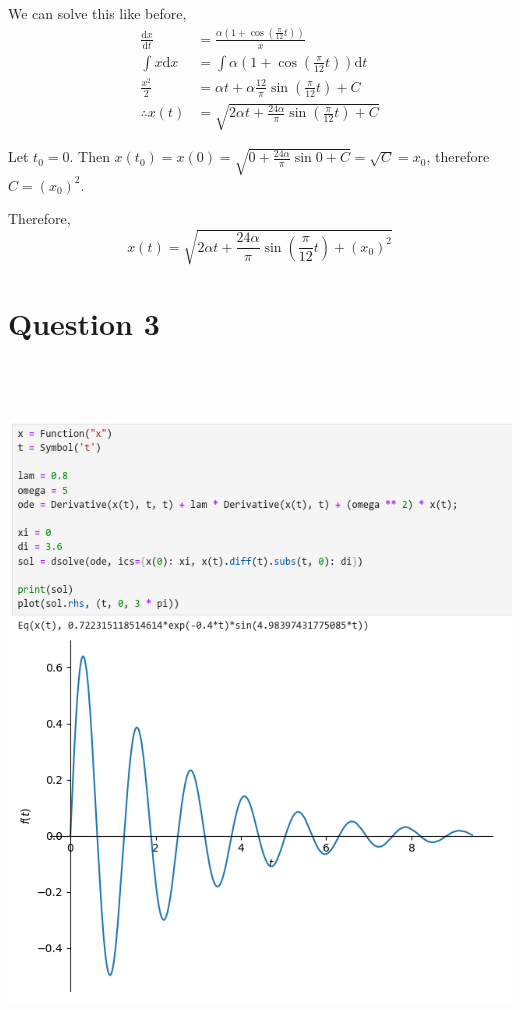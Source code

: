 \documentclass[a4paper]{article}
\begin{document}
We can solve this like before, \begin{align*}
	\frac{\mathrm d x}{\mathrm d t} &= \frac{\alpha \left(1 + \cos\left( \frac{\pi}{12} t \right)\right)}{x}\\[1ex]
	\int x \mathrm d x &= \int \alpha \left( 1 + \cos\left(\frac{\pi}{12} t\right) \right) \mathrm d t\\[1ex]
	\frac{x^2}{2} &= \alpha t + \alpha \frac{12}{\pi} \sin \left(\frac{\pi}{12} t\right) + C\\[1ex]
	\therefore x(t) &= \sqrt{2\alpha t + \frac{24\alpha}{\pi} \sin \left(\frac{\pi}{12} t\right) + C}
\end{align*}

Let $t_0 = 0$. Then $x(t_0) = x(0) = \sqrt{0 + \frac{24 \alpha}{\pi} \sin 0 + C} = \sqrt{C} = x_0$, therefore $C = (x_0)^2$.

Therefore, $$x(t) = \sqrt{2\alpha t + \frac{24\alpha}{\pi} \sin \left(\frac{\pi}{12} t\right) + (x_0)^2}$$


\section*{Question 3}
\setcounter{section}{3}
\setcounter{subsection}{0}

\subsection{~}

\includegraphics[scale=0.6]{Q3-a}
\end{document}
